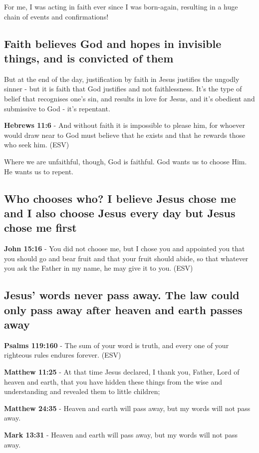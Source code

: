 \documentclass[11pt]{article}
\begin{document}
For me, I was acting in faith ever since I was born-again, resulting in a huge chain of events and confirmations!

\subsection{Faith believes God and hopes in invisible things, and is convicted of them}
\label{sec:org13e4cb9}

But at the end of the day, justification by faith in Jesus justifies the ungodly sinner - but it is faith that God justifies and not faithlessness. It's the type of belief that recognises one's sin, and results in love for Jesus, and it's obedient and submissive to God - it's repentant.

\textbf{Hebrews 11:6} - And without faith it is impossible to please him, for whoever would draw near to God must believe that he exists and that he rewards those who seek him. (ESV)

Where we are unfaithful, though, God is faithful. God wants us to choose Him. He wants us to repent.

\subsection{Who chooses who? I believe Jesus chose me and I also choose Jesus every day but Jesus chose me first}
\label{sec:org46142d8}
\textbf{John 15:16} - You did not choose me, but I chose you and appointed you that you should go and bear fruit and that your fruit should abide, so that whatever you ask the Father in my name, he may give it to you. (ESV)

\subsection{Jesus' words never pass away. The law could only pass away after heaven and earth passes away}
\label{sec:orgea684d9}
\textbf{Psalms 119:160} - The sum of your word is truth, and every one of your righteous rules endures forever. (ESV)

\textbf{Matthew 11:25} - At that time Jesus declared, I thank you, Father, Lord of heaven and earth, that you have hidden these things from the wise and understanding and revealed them to little children;

\textbf{Matthew 24:35} - Heaven and earth will pass away, but my words will not pass away.

\textbf{Mark 13:31} - Heaven and earth will pass away, but my words will not pass away.
\end{document}
